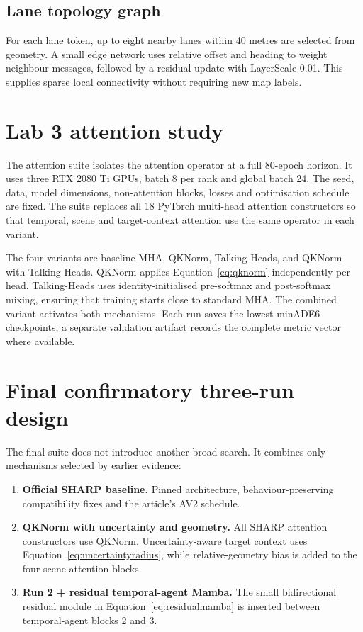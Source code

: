 \subsection{Lane topology graph}

For each lane token, up to eight nearby lanes within 40 metres are selected from geometry. A small edge network uses relative offset and heading to weight neighbour messages, followed by a residual update with LayerScale 0.01. This supplies sparse local connectivity without requiring new map labels.

\section{Lab 3 attention study}

The attention suite isolates the attention operator at a full 80-epoch horizon. It uses three RTX 2080 Ti GPUs, batch 8 per rank and global batch 24. The seed, data, model dimensions, non-attention blocks, losses and optimisation schedule are fixed. The suite replaces all 18 PyTorch multi-head attention constructors so that temporal, scene and target-context attention use the same operator in each variant.

The four variants are baseline MHA, QKNorm, Talking-Heads, and QKNorm with Talking-Heads. QKNorm applies Equation~\ref{eq:qknorm} independently per head. Talking-Heads uses identity-initialised pre-softmax and post-softmax mixing, ensuring that training starts close to standard MHA. The combined variant activates both mechanisms. Each run saves the lowest-minADE6 checkpoints; a separate validation artifact records the complete metric vector where available.

\section{Final confirmatory three-run design}

The final suite does not introduce another broad search. It combines only mechanisms selected by earlier evidence:

\begin{enumerate}
    \item \textbf{Official SHARP baseline.} Pinned architecture, behaviour-preserving compatibility fixes and the article's AV2 schedule.
    \item \textbf{QKNorm with uncertainty and geometry.} All SHARP attention constructors use QKNorm. Uncertainty-aware target context uses Equation~\ref{eq:uncertaintyradius}, while relative-geometry bias is added to the four scene-attention blocks.
    \item \textbf{Run 2 + residual temporal-agent Mamba.} The small bidirectional residual module in Equation~\ref{eq:residualmamba} is inserted between temporal-agent blocks 2 and 3.
\end{enumerate}

